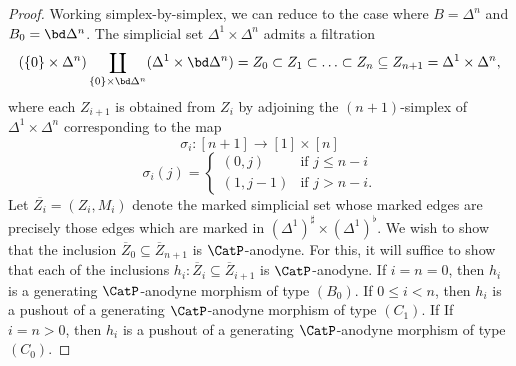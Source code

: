 \begin{proof}
Working simplex-by-simplex, we can reduce to the case where
$B = \Delta^n$ and $B_0 = \bd \Delta^n$. The simplicial
set $\Delta^1 \times \Delta^n$ admits a filtration
$$ (\{0\} \times \Delta^n) \coprod_{ \{0\} \times \bd \Delta^n} ( \Delta^1 \times \bd \Delta^n)
= Z_0 \subset Z_1 \subset \ldots \subset Z_{n} \subseteq Z_{n+1} = \Delta^1 \times \Delta^n,$$
where each $Z_{i+1}$ is obtained from $Z_{i}$ by adjoining the $(n+1)$-simplex of
$\Delta^1 \times \Delta^n$ corresponding to the map
$$ \sigma_i: [n+1] \rightarrow [1] \times [n]$$
$$ \sigma_i(j) = \begin{cases} (0,j) & \text{if } j \leq n-i \\
(1, j-1) & \text{if } j > n-i. \end{cases}$$
Let $\overline{Z_i} = (Z_i, M_i)$ denote the marked simplicial set whose marked edges
are precisely those edges which are marked in $(\Delta^1)^{\sharp} \times (\Delta^1)^{\flat}$. We wish to show that the inclusion
$\overline{Z}_0 \subseteq \overline{Z}_{n+1}$ is $\CatP$-anodyne. For this, it will suffice to show that each of the inclusions $h_i: \overline{Z}_i \subseteq \overline{Z}_{i+1}$ is $\CatP$-anodyne. If 
$i=n=0$, then $h_i$ is a generating $\CatP$-anodyne morphism of type $(B_0)$.
If $0 \leq i < n$, then $h_i$ is a pushout of a generating $\CatP$-anodyne morphism of type $(C_1)$. If If $i=n>0$, then $h_i$ is a pushout of a generating $\CatP$-anodyne morphism of type $(C_0)$. 
\end{proof}

